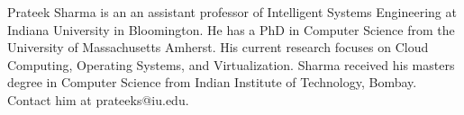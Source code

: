 \begin{IEEEbiography}{Prateek Sharma}
  is an an assistant professor of Intelligent Systems Engineering at Indiana University in Bloomington. He has a PhD in Computer Science from 
the University of Massachusetts Amherst. His current research
  focuses on Cloud Computing, Operating Systems, and
  Virtualization. Sharma received his masters degree in Computer Science from
  Indian Institute of Technology, Bombay. Contact him at
  prateeks@iu.edu.
\end{IEEEbiography}




